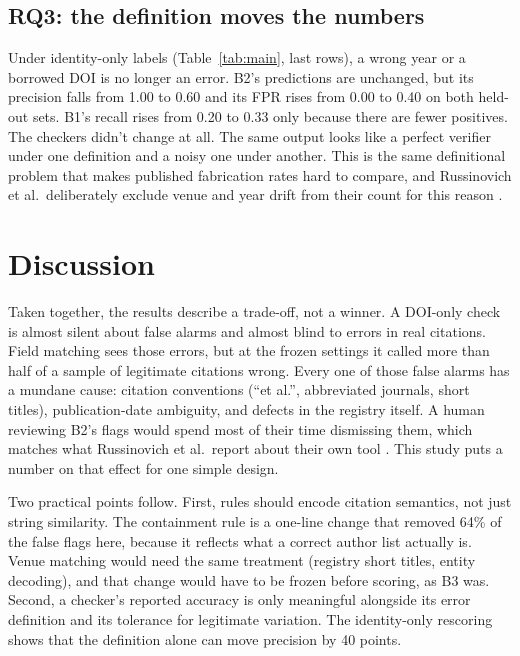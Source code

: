 \documentclass[acmsmall,screen,nonacm]{acmart}
\newcommand{\BOne}{B1}
\newcommand{\BTwo}{B2}
\newcommand{\BThree}{B3}
\begin{document}
\subsection{RQ3: the definition moves the numbers}
Under identity-only labels (Table~\ref{tab:main}, last rows), a wrong year or a borrowed DOI is no longer an error. \BTwo{}'s predictions are unchanged, but its precision falls from 1.00 to 0.60 and its FPR rises from 0.00 to 0.40 on both held-out sets. \BOne{}'s recall rises from 0.20 to 0.33 only because there are fewer positives. The checkers didn't change at all. The same output looks like a perfect verifier under one definition and a noisy one under another. This is the same definitional problem that makes published fabrication rates hard to compare, and Russinovich et al.\ deliberately exclude venue and year drift from their count for this reason \citep{russinovich2026}.

\section{Discussion}
Taken together, the results describe a trade-off, not a winner. A DOI-only check is almost silent about false alarms and almost blind to errors in real citations. Field matching sees those errors, but at the frozen settings it called more than half of a sample of legitimate citations wrong. Every one of those false alarms has a mundane cause: citation conventions (``et al.'', abbreviated journals, short titles), publication-date ambiguity, and defects in the registry itself. A human reviewing \BTwo{}'s flags would spend most of their time dismissing them, which matches what Russinovich et al.\ report about their own tool \citep{russinovich2026}. This study puts a number on that effect for one simple design.

Two practical points follow. First, rules should encode citation semantics, not just string similarity. The containment rule is a one-line change that removed 64\% of the false flags here, because it reflects what a correct author list actually is. Venue matching would need the same treatment (registry short titles, entity decoding), and that change would have to be frozen before scoring, as \BThree{} was. Second, a checker's reported accuracy is only meaningful alongside its error definition and its tolerance for legitimate variation. The identity-only rescoring shows that the definition alone can move precision by 40 points.
\end{document}

